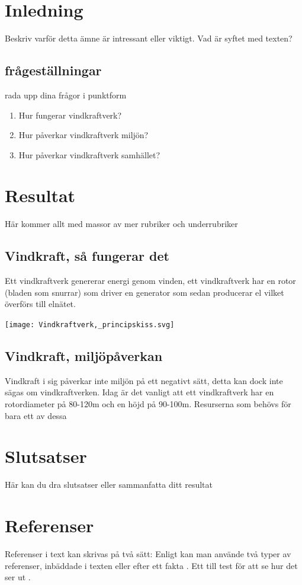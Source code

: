 \documentclass[11p]{article}
\begin{document}
    \section{Inledning}
    Beskriv varför detta ämne är intressant eller viktigt. Vad är syftet med texten?
    \subsection{frågeställningar}
    rada upp dina frågor i punktform
    \begin{enumerate}
        \item Hur fungerar vindkraftverk?
        \item Hur påverkar vindkraftverk miljön?
        \item Hur påverkar vindkraftverk samhället?
    \end{enumerate}

    \section{Resultat}
    Här kommer allt med massor av mer rubriker och underrubriker
    \subsection{Vindkraft, så fungerar det}
    Ett vindkraftverk genererar energi genom vinden, ett vindkraftverk har en rotor (bladen som snurrar) som driver en generator som sedan producerar el vilket överförs till elnätet.

    \texttt{[image: Vindkraftverk,\_principskiss.svg]}


    \subsection{Vindkraft, miljöpåverkan}
    Vindkraft i sig påverkar inte miljön på ett negativt sätt, detta kan dock inte sägas om vindkraftverken. Idag är det vanligt att ett vindkraftverk har en rotordiameter på 80-120m och en höjd på 90-100m.
    Resurserna som behövs för bara ett av dessa

    \section{Slutsatser}
    Här kan du dra slutsatser eller sammanfatta ditt resultat


    \section{Referenser}
    Referenser i text kan skrivas på två sätt: Enligt \textcite{Jens} kan man använde två typer av referenser, inbäddade i texten eller efter ett fakta \parencite{Fraenkel}. Ett till test för att se hur det ser ut \parencite[sid 55]{fermi}.
\end{document}
